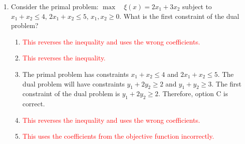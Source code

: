 \documentclass{article}%
\newcommand{\incorrect}[1]{\textcolor{red}{#1}}
\begin{document}
\begin{enumerate}
\begin{enumerate}
\item \incorrect{This option incorrectly uses the vector $c$ instead of $b$ in the dual objective function.}%
\item \incorrect{This option seems to arbitrarily select elements from $A$ and $b$ to form the objective function.}%
\item \incorrect{This option seems to arbitrarily select elements from $A$ and $b$ to form the objective function.}%
\item \incorrect{This option reverses the order of elements in $b$ when forming the objective function.}%
\end{enumerate}%
\vspace{1em}%
\item Consider the primal problem: $\max \quad \xi(x) = 2x_1 + 3x_2$ subject to $x_1 + x_2 \le 4$, $2x_1 + x_2 \le 5$, $x_1, x_2 \ge 0$. What is the first constraint of the dual problem?%
\begin{enumerate}%
\item \incorrect{This reverses the inequality and uses the wrong coefficients.}%
\item \incorrect{This reverses the inequality.}%
\item The primal problem has constraints $x_1 + x_2 \le 4$ and $2x_1 + x_2 \le 5$. The dual problem will have constraints $y_1 + 2y_2 \ge 2$ and $y_1 + y_2 \ge 3$. The first constraint of the dual problem is $y_1 + 2y_2 \ge 2$. Therefore, option C is correct.%
\item \incorrect{This reverses the inequality and uses the wrong coefficients.}%
\item \incorrect{This uses the coefficients from the objective function incorrectly.}%
\end{enumerate}%
\vspace{1em}%
\end{enumerate}

%
\end{document}
